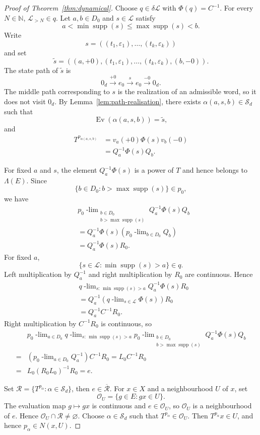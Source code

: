 \documentclass[11pt]{amsart}
\theoremstyle{definition}
\theoremstyle{remark}
\newcommand{\N}{\mathbb N}
\newcommand{\Sd}{\mathcal S_d}
\newcommand{\cL}{\mathcal L}
\newcommand{\supp}{\operatorname{supp}}
\newcommand{\ulim}[2]{#1\!\operatorname{-lim}_{#2}}
\begin{document}
\begin{proof}[Proof of Theorem~\ref{thm:dynamical}]
Choose $q\in\delta\cL$ with $\Phi(q)=C^{-1}$.
For every $N\in\N$, $\cL_{>N}\in q$.
Let $a,b\in D_0$ and $s\in\cL$ satisfy
\[
 a<\min\supp(s)\leq\max\supp(s)<b.
\]
Write  
\[
 s=((t_1,\varepsilon_1),\ldots,(t_k,\varepsilon_k))
\]
and set
\[
 \widetilde s
 =((a,+0),(t_1,\varepsilon_1),\ldots,(t_k,\varepsilon_k),(b,-0)).
\]
The state path of $\widetilde s$ is
\[
 0_d \xrightarrow{+0} e_0 \xrightarrow{s} e_0\xrightarrow{-0} 0_d.
\]
The middle path corresponding to $s$ is the realization of an admissible word, so it does not visit $0_d$.
By Lemma~\ref{lem:path-realisation}, there exists $ \alpha(a,s,b) \in \Sd$  such that 
\[
 \operatorname{Ev}( \alpha(a,s,b))=\widetilde s,
\]
and
\[
 \begin{aligned}
 T^{p_{ \alpha(a,s,b) }}
 &=v_a(+0)\Phi(s)v_b(-0)\\
 &=Q_a^{-1}\Phi(s)Q_b.
\end{aligned}   
\]
 

For fixed $a$ and $s$, the element $Q_a^{-1}\Phi(s)$ is a power of $T$ and  hence belongs to $\Lambda(E)$.  Since
\[
 \{b\in D_0:b>\max\supp(s)\}\in p_0,
\]
we have
\[
\begin{aligned}
 &\ulim{  p_0}
      {\substack{b\in D_0\\b>\max\supp(s)}}
 Q_a^{-1}\Phi(s)Q_b\\
 & =Q_a^{-1}\Phi(s)
   \left(\ulim{  p_0}{b\in D_0}Q_b\right)\\
 &=Q_a^{-1}\Phi(s)R_0.
\end{aligned}
\]
For fixed $a$,
\[
 \{s\in\cL:\min\supp(s)>a\}\in q.
\]
Left multiplication by $Q_a^{-1}$ and right multiplication by $R_0$ are continuous.  Hence
\[
\begin{aligned}
 &\ulim{q}{s:\,\min\supp(s)>a}
 Q_a^{-1}\Phi(s)R_0\\
 & =Q_a^{-1}
   \left(\ulim{q}{s\in\cL}\Phi(s)\right)R_0\\
 & =Q_a^{-1}C^{-1}R_0.
\end{aligned}
\]
Right multiplication by $C^{-1}R_0$ is continuous, so
\[
 \begin{aligned}
 &\ulim{  p_0}{a\in D_0}
  \ulim{q}{s:\,\min\supp(s)>a}
  \ulim{ p_0}
       {\substack{b\in D_0\\b>\max\supp(s)}}
 Q_a^{-1}\Phi(s)Q_b\\
  = & \left(\ulim{ p_0}{a\in D_0}Q_a^{-1}\right)C^{-1}R_0 
  = L_0C^{-1}R_0 \\
  =&L_0(R_0L_0)^{-1}R_0 =e.
\end{aligned}   
\]
 
Set $\mathcal R=\{T^{p_\alpha}:\alpha\in\Sd\}$, then $e\in\overline{\mathcal R}$.
For $x\in X$ and a neighbourhood $U$ of $x$, set
\[
 \mathcal O_U=\{g\in E:gx\in U\}.
\]
The evaluation map $g\mapsto gx$ is continuous and $e\in\mathcal O_U$, so
$\mathcal O_U$ is a neighbourhood of $e$.  Hence $\mathcal O_U\cap\mathcal R\neq\varnothing$.
Choose $\alpha\in\Sd$ such that
$T^{p_\alpha}\in\mathcal O_U$.  Then $T^{p_\alpha}x\in U$,
and hence $p_\alpha\in N(x,U)$.
 

\end{proof}
\end{document}
